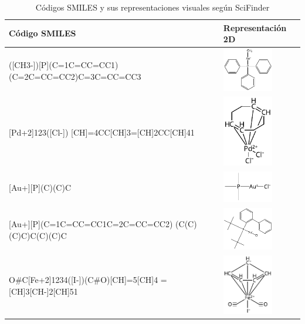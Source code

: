 \begin{table}[h!]
\small
\centering
    \begin{tabular}{m{7cm}>{\centering\arraybackslash}m{4cm}}
        \hline
        \textbf{Código SMILES} & \textbf{Representación 2D} \\
        \hline
        [Au+]([CH3-])[P](C=1C=CC=CC1) (C=2C=CC=CC2)C=3C=CC=CC3 & \includegraphics[width=2.2cm]{imagenes/sciFinder/pdf/Methyl(triphenylphosphine)gold(I).pdf} \\
        \hline
        [Cl-][Pd+2]123([Cl-]) [CH]=4CC[CH]3=[CH]2CC[CH]41 & \includegraphics[width=2.2cm]{imagenes/sciFinder/pdf/Dichloro(1,5-cyclooctadiene)palladium(II).pdf} \\
        \hline
        [Cl-][Au+][P](C)(C)C & \includegraphics[width=2.2cm]{imagenes/sciFinder/pdf/Chloro(trimethylphosphine)gold(I).pdf} \\
        \hline
        [Cl-][Au+][P](C=1C=CC=CC1C=2C=CC=CC2) (C(C)(C)C)C(C)(C)C & \includegraphics[width=2.2cm]{imagenes/sciFinder/pdf/Chloro[(1,1-biphenyl-2-yl)di-tert-butylphosphine]gold(I).pdf} \\
        \hline
        O\#C[Fe+2]1234([I-])(C\#O)[CH]=5[CH]4 =[CH]3[CH-]2[CH]51 & \includegraphics[width=2.2cm]{imagenes/sciFinder/pdf/Dicarbonylcyclopentadienyliodoiron(II).pdf} \\
        \hline
        \end{tabular}
    \caption{Códigos SMILES y sus representaciones visuales según SciFinder}
    \label{tabla:tabla_peq_intro_sciFinder}
\end{table}


